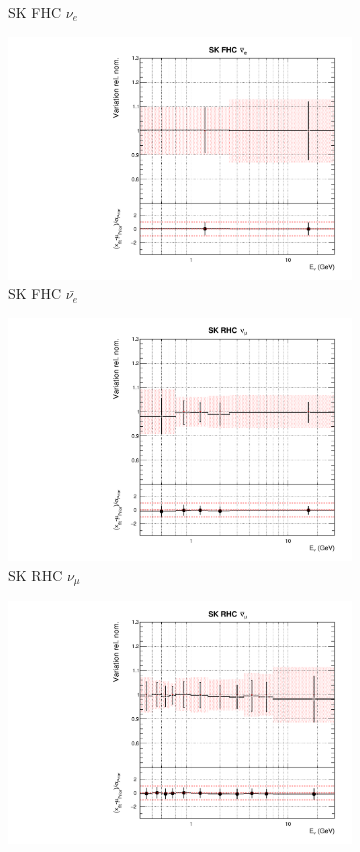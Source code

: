 \begin{figure}[!htbp]
\begin{subfigure}{0.45\textwidth}
  \caption{SK FHC $\nu_{e}$}
\end{subfigure}
\begin{subfigure}{0.45\textwidth}
  \centering
  \includegraphics[width=0.75\linewidth]{figs/asmvfluxpoly11}
  \caption{SK FHC $\bar{\nu_{e}}$}
\end{subfigure}
\begin{subfigure}{0.45\textwidth}
  \centering
  \includegraphics[width=0.75\linewidth]{figs/asmvfluxpoly12}
  \caption{SK RHC $\nu_{\mu}$}
\end{subfigure}
\begin{subfigure}{0.45\textwidth}
  \centering
  \includegraphics[width=0.75\linewidth]{figs/asmvfluxpoly13}

\end{subfigure}
\end{figure}
